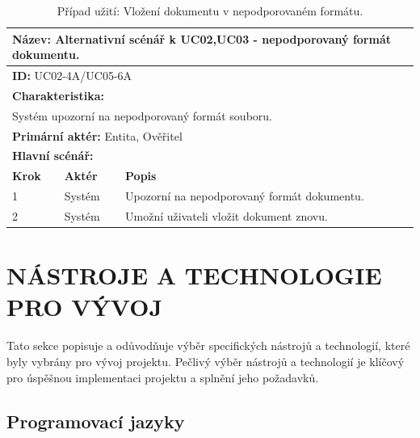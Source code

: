 \vspace{-1mm} %
\renewcommand{\arraystretch}{1.5} %
\begin{table}[h]
	\centering
	\begin{tabular}{|p{1cm}|p{2cm}|p{10cm}|}
		\hline
		\multicolumn{3}{|l|}{\textbf{Název:} Alternativní scénář k UC02,UC03 - nepodporovaný formát dokumentu.} \\ \hline
		\multicolumn{3}{|l|}{\textbf{ID:} UC02-4A/UC05-6A} \\ \hline
		\multicolumn{3}{|l|}{\textbf{Charakteristika:}} \\ \hline
		\multicolumn{3}{|l|}{Systém upozorní na nepodporovaný formát souboru.} \\ \hline
		\multicolumn{3}{|l|}{\textbf{Primární aktér:} Entita, Ověřitel} \\ \hline
		\multicolumn{3}{|l|}{\textbf{Hlavní scénář:}} \\ \hline
		\textbf{Krok} & \textbf{Aktér} & \textbf{Popis} \\ \hline
		1 & Systém    & Upozorní na nepodporovaný formát dokumentu. \\ \hline
		2 & Systém    & Umožní uživateli vložit dokument znovu. \\ \hline
		
	\end{tabular}
	\vspace{10pt} %
	\caption{Případ užití: Vložení dokumentu v nepodporovaném formátu.}
	\label{tab:usecase-alt-intput-document-attestation}
\end{table}
\renewcommand{\arraystretch}{1} %








\clearpage
\section{NÁSTROJE A TECHNOLOGIE PRO VÝVOJ}

Tato sekce popisuje a odůvodňuje výběr specifických nástrojů a technologií, které byly vybrány pro vývoj projektu. Pečlivý výběr nástrojů a technologií je klíčový pro úspěšnou implementaci projektu a splnění jeho požadavků.

\subsection{Programovací jazyky}

